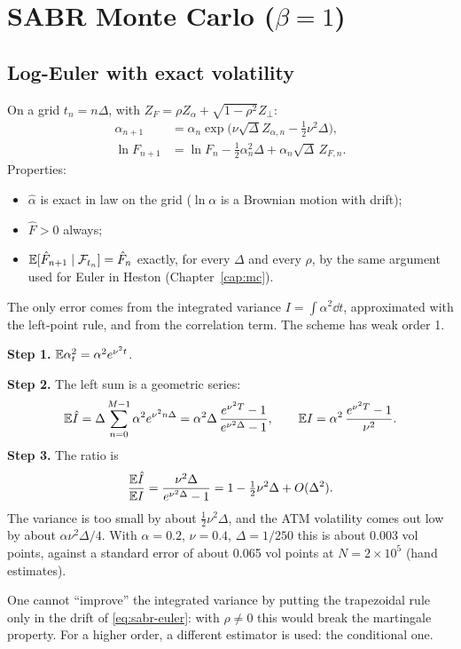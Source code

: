 \section{\texorpdfstring{SABR Monte Carlo ($\beta=1$)}{SABR Monte Carlo (β=1)}}
\subsection{Log-Euler with exact volatility}
On a grid $t_n=n\Delta$, with $Z_F=\rho Z_\alpha+\sqrt{1-\rho^2}Z_\perp$:
\begin{align}
\alpha_{n+1}&=\alpha_n\exp\big(\nu\sqrt\Delta Z_{\alpha,n}-\tfrac12\nu^2\Delta\big),\label{eq:sabr-alpha}\\
\ln F_{n+1}&=\ln F_n-\tfrac12\alpha_n^2\Delta+\alpha_n\sqrt\Delta\, Z_{F,n}.\label{eq:sabr-euler}
\end{align}
Properties:
\begin{itemize}
\item $\hat\alpha$ is exact in law on the grid ($\ln\alpha$ is a Brownian motion with drift);
\item $\hat F>0$ always;
\item $\mathbb{E}[\hat F_{n+1}\mid\mathcal F_{t_n}]=\hat F_n$ exactly, for every $\Delta$ and every $\rho$, by the same
argument used for Euler in Heston (Chapter~\ref{cap:mc}).
\end{itemize}
The only error comes from the integrated variance $I=\int\alpha^2\dd t$, approximated with the left-point rule, and
from the correlation term. The scheme has weak order 1.

\begin{perche}[title={How biased is the integrated variance?}]
\noindent\textbf{Step 1.} $\mathbb{E}\alpha_t^2=\alpha^2e^{\nu^2t}$.

\noindent\textbf{Step 2.} The left sum is a geometric series:
\[
\mathbb{E}\hat I=\Delta\sum_{n=0}^{M-1}\alpha^2e^{\nu^2n\Delta}=\alpha^2\Delta\,\frac{e^{\nu^2T}-1}{e^{\nu^2\Delta}-1},
\qquad\mathbb{E} I=\alpha^2\,\frac{e^{\nu^2T}-1}{\nu^2}.
\]
\noindent\textbf{Step 3.} The ratio is
\[
\frac{\mathbb{E}\hat I}{\mathbb{E} I}=\frac{\nu^2\Delta}{e^{\nu^2\Delta}-1}=1-\tfrac12\nu^2\Delta+O(\Delta^2).
\]
The variance is too small by about $\tfrac12\nu^2\Delta$, and the ATM volatility comes out low by about
$\alpha\nu^2\Delta/4$. With $\alpha=0.2$, $\nu=0.4$, $\Delta=1/250$ this is about 0.003 vol points, against a standard
error of about 0.065 vol points at $N=2\times10^5$ (hand estimates).
\end{perche}

\begin{attenzione}
One cannot ``improve'' the integrated variance by putting the trapezoidal rule only in the drift of
\eqref{eq:sabr-euler}: with $\rho\ne0$ this would break the martingale property. For a higher order, a different
estimator is used: the conditional one.
\end{attenzione}

